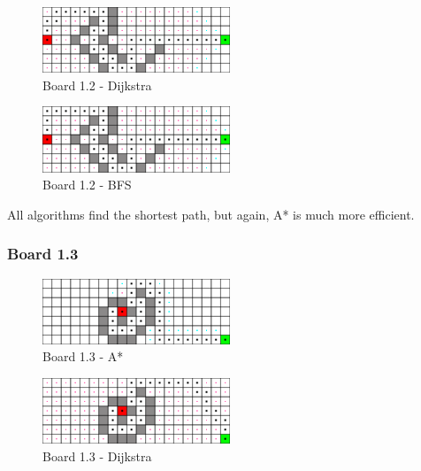 \begin{figure}[h!]
  \centering
    \includegraphics[width=0.5\textwidth]{img/board-1-2-dijkstra}
    \caption{Board 1.2 - Dijkstra}
\end{figure}

\begin{figure}[h!]
  \centering
    \includegraphics[width=0.5\textwidth]{img/board-1-2-bfs}
    \caption{Board 1.2 - BFS}
\end{figure}

All algorithms find the shortest path, but again, A* is much more efficient.

\newpage

\subsubsection*{Board 1.3}

\begin{figure}[h!]
  \centering
    \includegraphics[width=0.5\textwidth]{img/board-1-3-astar}
    \caption{Board 1.3 - A*}

\end{figure}

\begin{figure}[h!]
  \centering
    \includegraphics[width=0.5\textwidth]{img/board-1-3-dijkstra}
    \caption{Board 1.3 - Dijkstra}
\end{figure}

